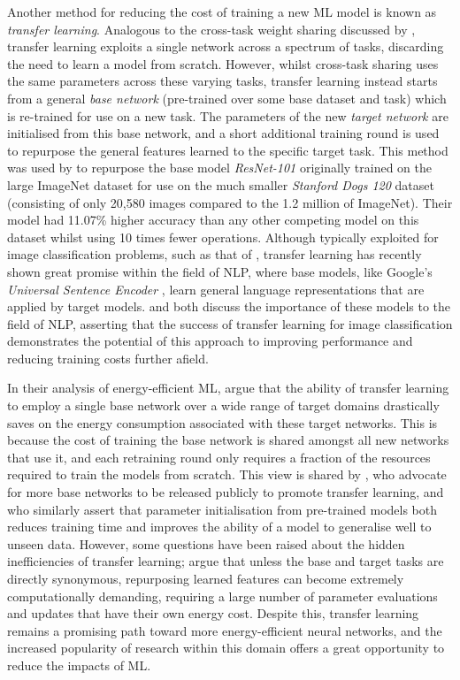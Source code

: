 \documentclass[a4paper, 12pt]{article}
\begin{document}
    Another method for reducing the cost of training a new ML model is known as \emph{transfer learning}. Analogous to the cross-task weight sharing discussed by , transfer learning exploits a single network across a spectrum of tasks, discarding the need to learn a model from scratch. However, whilst cross-task sharing uses the same parameters across these varying tasks, transfer learning instead starts from a general \emph{base network} (pre-trained over some base dataset and task) which is re-trained for use on a new task. The parameters of the new \emph{target network} are initialised from this base network, and a short additional training round is used to repurpose the general features learned to the specific target task. This method was used by  to repurpose the base model \emph{ResNet-101} \cite{he-2015} originally trained on the large ImageNet dataset for use on the much smaller \emph{Stanford Dogs 120} dataset (consisting of only 20,580 images compared to the 1.2 million of ImageNet). Their model had 11.07\% higher accuracy than any other competing model on this dataset whilst using 10 times fewer operations. Although typically exploited for image classification problems, such as that of , transfer learning has recently shown great promise within the field of NLP, where base models, like Google's \emph{Universal Sentence Encoder} \cite{cer-2018}, learn general language representations that are applied by target models.  and  both discuss the importance of these models to the field of NLP, asserting that the success of transfer learning for image classification demonstrates the potential of this approach to improving performance and reducing training costs further afield.

    In their analysis of energy-efficient ML,  argue that the ability of transfer learning to employ a single base network over a wide range of target domains drastically saves on the energy consumption associated with these target networks. This is because the cost of training the base network is shared amongst all new networks that use it, and each retraining round only requires a fraction of the resources required to train the models from scratch. This view is shared by , who advocate for more base networks to be released publicly to promote transfer learning, and  who similarly assert that parameter initialisation from pre-trained models both reduces training time and improves the ability of a model to generalise well to unseen data. However, some questions have been raised about the hidden inefficiencies of transfer learning;  argue that unless the base and target tasks are directly synonymous, repurposing learned features can become extremely computationally demanding, requiring a large number of parameter evaluations and updates that have their own energy cost. Despite this, transfer learning remains a promising path toward more energy-efficient neural networks, and the increased popularity of research within this domain offers a great opportunity to reduce the impacts of ML.
\end{document}
